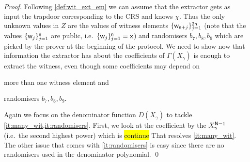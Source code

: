 \documentclass[runningheads]{llncs}
\theoremstyle{definition}
\begin{document}
\begin{proof}
Following \cref{def:wit_ext_em} we can assume that the extractor gets as input the trapdoor corresponding to the CRS and knows $\chi$.
Thus the only unknown values in $Z$ are the values of witness elements $\{\mathsf{w}_{\mathsf{n} + j}\}_{j = 1}^{2 \mathsf{n}}$ (note that the values $\{\mathsf{w}_{j}\}_{j = 1}^{\mathsf{n}}$ are public, i.e.~$\{\mathsf{w}_{j}\}_{j = 1}^{\mathsf{n}} = \mathsf{x}$) and randomisers $b_7, b_8, b_9$ which are picked by the prover at the beginning of the protocol. 
We need to show now that information the extractor has about the coefficients of $\Gamma(X_\gamma)$ is enough to extract the witness, even though some coefficients may depend on
\begin{inparaenum}[(i)]
	\item more than one witness element and\label{it:many_wit}
	\item randomisers $b_7, b_8, b_9$.\label{it:randomisers}
\end{inparaenum}
%
Again we focus on the denominator function $D(X_\gamma)$ to tackle \cref{it:many_wit,it:randomisers}.
First, we look at the coefficient by the $X_\gamma^{\mathsf{N} - 1}$ (i.e.~the second highest power) which is  \hl{continue}
That resolves \cref{it:many_wit}. The other issue that comes with \cref{it:randomisers} is easy since there are no randomisers used in the denominator polynomial.
\qed
\end{proof}
\end{document}
